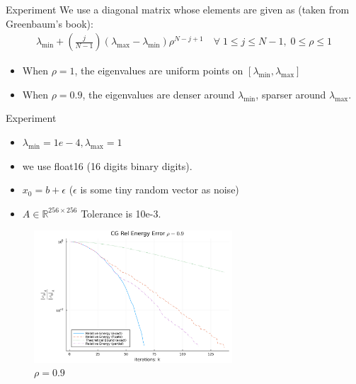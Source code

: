 \documentclass{beamer}
\begin{document}
    \begin{frame}{Experiment}
        We use a diagonal matrix whose elements are given as (taken from Greenbaum's book\cite{book:greenbaum}): 
        \begin{align}\label{eqn:paramaterized_experiment_matrix}
            \lambda_{\min} + \left(
                \frac{j}{N - 1}
            \right)(\lambda_{\max} - \lambda_{\min})\rho^{N - j + 1}\quad \forall\; 1 \le j \le N - 1, \; 0 \le \rho \le 1
        \end{align}
        \begin{itemize}
            \item When $\rho = 1$, the eigenvalues are uniform points on $[\lambda_{\min}, \lambda_{\max}]$
            \item When $\rho = 0.9$, the eigenvalues are denser around $\lambda_{\min}$, sparser around $\lambda_{\max}$. 
        \end{itemize}
    \end{frame}
    \begin{frame}{Experiment}
        \begin{itemize}
             \item $\lambda_{\min} = 1e-4, \lambda_{\max} = 1$
             \item we use float16 (16 digits binary digits).
             \item $x_0 = b + \epsilon$ ($\epsilon$ is some tiny random vector as noise)
             \item $A \in \mathbb R^{256\times 256}$ Tolerance is 10e-3. 
        \end{itemize}
         
        \begin{figure}[H]
                \centering
                \includegraphics[width=20em]{cg_convergence_0.9.png}
                \caption{$\rho = 0.9$}
        \end{figure}
    \end{frame}
\end{document}
